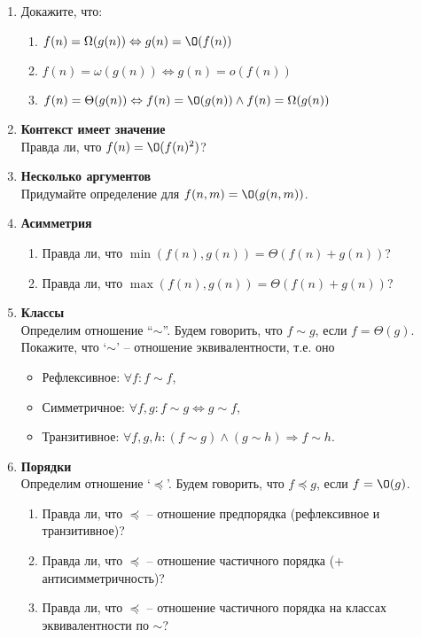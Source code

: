 \begin{enumerate}
  \item
    Докажите, что:
    \begin{enumerate}
      \item $f(n) = \Omega(g(n)) \Leftrightarrow g(n) = \O(f(n))$
      \item $f(n) = \omega(g(n)) \Leftrightarrow g(n) = o(f(n))$
      \item $f(n) = \Theta(g(n)) \Leftrightarrow f(n) = \O(g(n)) \wedge f(n) = \Omega(g(n))$
    \end{enumerate}

  \item
    {\bf Контекст имеет значение} \\
    Правда ли, что $f(n) = \O(f(n)^2)$?

  \item
	{\bf Несколько аргументов}\\
	Придумайте определение для $f(n, m) = \O(g(n, m))$.
	
  \item
    {\bf Асимметрия}
    \begin{enumerate}
      \item Правда ли, что $\min(f(n), g(n)) = \Theta(f(n) + g(n))$?
      \item Правда ли, что $\max(f(n), g(n)) = \Theta(f(n) + g(n))$?
    \end{enumerate}

  \item
    {\bf Классы} \\
    Определим отношение ``$\sim$''. Будем говорить, что $f \sim g$, если $f = \Theta(g)$. Покажите, что
    `$\sim$' -- отношение эквивалентности, т.е. оно
    \begin{itemize}
    \item Рефлексивное: $\forall f : f \sim f$,
    \item Симметричное: $\forall f, g: f \sim g \Leftrightarrow g \sim
      f$,
    \item Транзитивное: $\forall f, g, h: (f \sim g) \wedge (g \sim h)
      \Rightarrow f \sim h$.
    \end{itemize}

  \item
    {\bf Порядки} \\
    Определим отношение `$\preceq$'. Будем говорить, что $f \preceq g$, если $f = \O(g)$.
    
    \begin{enumerate}
      \item Правда ли, что $\preceq$ -- отношение предпорядка (рефлексивное и транзитивное)?
      \item Правда ли, что $\preceq$ -- отношение частичного порядка
        (+ антисимметричность)?
      \item Правда ли, что $\preceq$ -- отношение частичного порядка
        на классах эквивалентности по $\sim$?
    \end{enumerate}


\end{enumerate}
